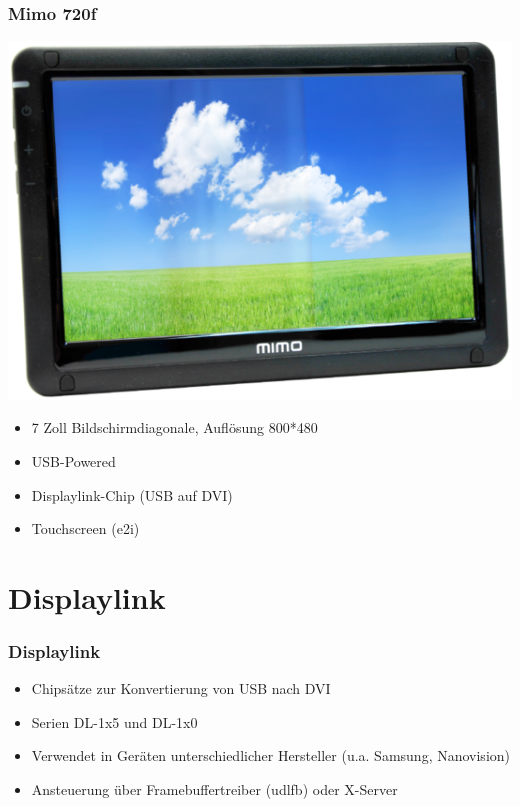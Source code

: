 \documentclass{beamer}
\begin{document}
	\begin{frame}
		\frametitle{Mimo 720f}
		\begin{center}
			\includegraphics[scale=0.3]{img/mimo720f}
		\end{center}
		
		\begin{itemize}
			\item 7 Zoll Bildschirmdiagonale, Auflösung 800*480
			\item USB-Powered
			\item Displaylink-Chip (USB auf DVI)
			\item Touchscreen (e2i)
		\end{itemize}
	\end{frame}

	\section{Displaylink}
	
	\begin{frame}
		\frametitle{Displaylink}
		\begin{itemize}
			\item Chipsätze zur Konvertierung von USB nach DVI
			\item Serien DL-1x5 und DL-1x0
			\item Verwendet in Geräten unterschiedlicher Hersteller (u.a. Samsung, Nanovision)
        	\item Ansteuerung über Framebuffertreiber (udlfb) oder X-Server
		\end{itemize}	
	\end{frame}	
\end{document}
